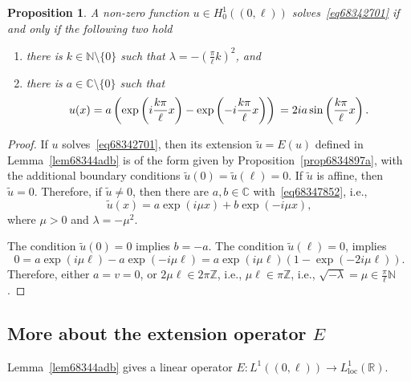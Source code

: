 \documentclass[a4paper,9pt]{amsart}
\newcommand{\N}{\mathbb{N}}	%
\newcommand{\Z}{\mathbb{Z}}	%
\newcommand{\R}{\mathbb{R}}	%
\newcommand{\C}{\mathbb{C}}	%
\newcommand{\loc}{\mathrm{loc}}
\theoremstyle{plain}
\newtheorem{proposition}{Proposition}[section]
\theoremstyle{definition}
\theoremstyle{remark}
\begin{document}
\begin{proposition}\label{prop68349083}
	A non-zero function $u\in H^1_0((0,\ell))$ solves~\eqref{eq68342701} if and only if the following two hold
	\begin{enumerate}
	\item
	there is $k\in\N\setminus\{0\}$ such that $\lambda = - \left( \frac{\pi}{\ell} k \right)^2$, and
	\item
	there is $a\in\C\setminus\{0\}$ such that
	\begin{equation}
		u(x) = a \left( \exp\left(i \frac{k\pi}{\ell} x \right) - \exp\left(-i \frac{k\pi}{\ell} x \right) \right) \\
		= 2ia \sin\left(\frac{k\pi}{\ell} x\right) .
	\end{equation}
	\end{enumerate}
\end{proposition}
\begin{proof}
	If $u$ solves~\eqref{eq68342701},
	then its extension $\tilde u = E(u)$ defined in Lemma~\ref{lem68344adb} is of the form given by Proposition~\ref{prop6834897a},
	with the additional boundary conditions $\tilde u(0)=\tilde u(\ell)=0$.
	If $\tilde u$ is affine, then $\tilde u =0$.
	Therefore, if $\tilde u\neq0$, then
	there are $a,b\in\C$ with~\eqref{eq68347852}, i.e.,
	\begin{equation}
		\tilde u(x) = a \exp(i\mu x) + b \exp(-i\mu x) ,
	\end{equation}
	where $\mu>0$ and $\lambda=-\mu^2$.
	
	The condition $\tilde u(0)=0$ implies $b=-a$.
	The condition $\tilde u(\ell)=0$, implies 
	\begin{equation}
		0 = a \exp(i\mu \ell) - a \exp(-i\mu \ell)
		= a\exp(i\mu\ell) (1-\exp(-2i\mu\ell)) .
	\end{equation}
	Therefore, either $a=v=0$, or $2\mu\ell\in 2\pi\Z$, 
	i.e., $\mu\ell\in \pi\Z$, 
	i.e., $\sqrt{-\lambda} = \mu\in \frac{\pi}{\ell}\N$.
\end{proof}

\subsection{More about the extension operator $E$}
Lemma~\ref{lem68344adb} gives a linear operator $E:L^1((0,\ell))\to L^1_\loc(\R)$.





\newpage
\end{document}

